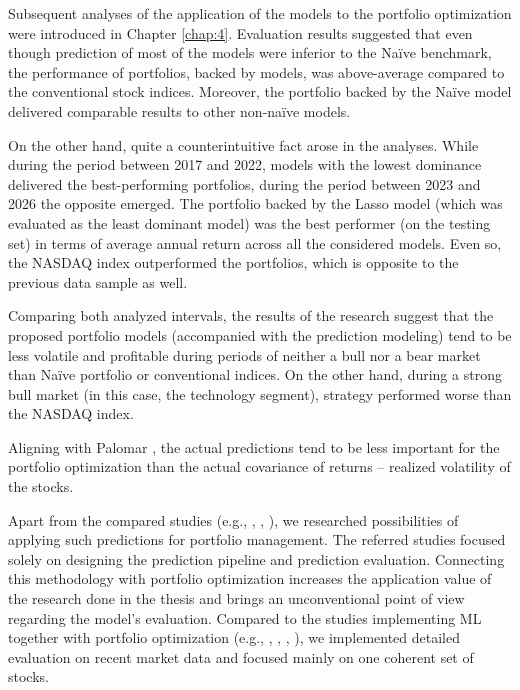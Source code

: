 Subsequent analyses of the application of the models to the portfolio optimization were introduced in Chapter \ref{chap:4}. Evaluation results suggested that even though prediction of most of the models were inferior to the Naïve benchmark,
the performance of portfolios, backed by models, was above-average compared to the conventional stock indices. Moreover, the portfolio backed by the Naïve model delivered comparable results to other non-naïve models.

On the other hand, quite a counterintuitive fact arose in the analyses. While during the period between 2017 and 2022, models with the lowest dominance delivered the best-performing portfolios, during the period between 2023 and 2026 the opposite
emerged. The portfolio backed by the Lasso model (which was evaluated as the least dominant model) was the best performer (on the testing set) in terms of average annual return across all the considered models. Even so, the NASDAQ index outperformed the portfolios, which is opposite
to the previous data sample as well.

Comparing both analyzed intervals, the results of the research suggest that the proposed portfolio models (accompanied with the prediction modeling) tend to be less volatile and profitable during periods of neither a bull nor a bear market than Naïve portfolio or conventional indices. On the other hand, during a strong bull market (in this case, the technology segment),
strategy performed worse than the NASDAQ index.

Aligning with Palomar \cite{portfolio}, the actual predictions tend to be less important for the portfolio optimization than the actual covariance of returns -- realized volatility of the stocks.
\newline
\par
Apart from the compared studies (e.g., \cite{krauss}, \cite{konferencia1}, \cite{zhao}), we researched possibilities of applying such predictions for portfolio management. The referred studies focused solely on designing the prediction pipeline and prediction evaluation. Connecting this methodology with portfolio optimization increases the application value of the research done in the thesis
and brings an unconventional point of view regarding the model's evaluation. Compared to the studies implementing ML together with portfolio optimization (e.g., \cite{chawee}, \cite{gu}, \cite{heaton}, \cite{ma}), we implemented detailed evaluation on recent market data and focused mainly on one coherent set of stocks.

